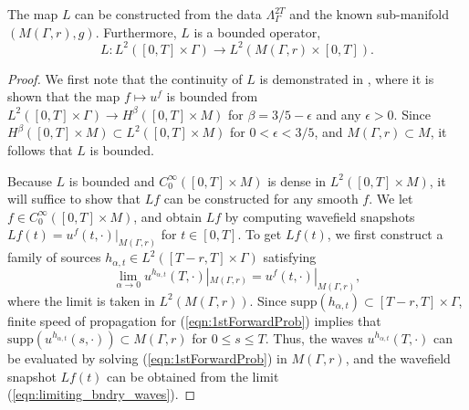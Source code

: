 \documentclass[final,leqno]{siamart1116}
\begin{document}
\begin{lemma}
  \label{thm:MovingRec}
  The map $L$ can be constructed from the data $\Lambda_{\Gamma}^{2T}$
  and the known sub-manifold $(M(\Gamma,r),g)$. Furthermore, $L$ is a
  bounded operator,
  \begin{equation}
    L : L^2([0,T] \times \Gamma) \rightarrow L^2(M(\Gamma,r) \times [0,T]).
  \end{equation}
\end{lemma}
\begin{proof}
  We first note that the continuity of $L$ is demonstrated in
  \cite[Thm 2.0.0]{Lasiecka1991}, where it is shown that the map $f
  \mapsto u^f$ is bounded from $L^2([0,T] \times \Gamma) \rightarrow
  H^\beta([0,T] \times M)$ for $\beta = 3/5 - \epsilon$ and any
  $\epsilon > 0$. Since $H^\beta([0,T] \times M) \subset L^2([0,T]
  \times M)$ for $0 < \epsilon < 3/5$, and $M(\Gamma,r) \subset M$, it
  follows that $L$ is bounded.

  Because $L$ is bounded and $C_0^\infty([0,T]\times M)$ is dense in
  $L^2([0,T]\times M)$, it will suffice to show that $Lf$ can be
  constructed for any smooth $f$. We let $f \in C_0^\infty([0,T] \times M)$,
  and obtain $Lf$ by computing wavefield snapshots $Lf(t) = u^f(t,
  \cdot)|_{M(\Gamma,r)}$ for $t \in [0,T]$. To get $Lf(t)$, we first
  construct a family of sources $h_{\alpha,t} \in
  L^2([T-r,T]\times\Gamma)$ satisfying
  \begin{equation}
    \label{eqn:limiting_bndry_waves}
    \lim_{\alpha \rightarrow 0} u^{h_{\alpha,t}}(T,\cdot)|_{M(\Gamma,r)}
    = u^f(t,\cdot)|_{M(\Gamma,r)},
  \end{equation}
  where the limit is taken in $L^2(M(\Gamma,r))$. Since
  ${\text{supp}}(h_{\alpha,t}) \subset [T-r,T]\times\Gamma$, finite speed of
  propagation for (\ref{eqn:1stForwardProb}) implies that ${\text{supp}}(u^{h_{\alpha,t}}(s,\cdot)) \subset
  M(\Gamma,r)$ for $0 \leq s \leq T$. Thus, the waves
  $u^{h_{\alpha,t}}(T,\cdot)$ can be evaluated by solving
  (\ref{eqn:1stForwardProb}) in $M(\Gamma,r)$, and the wavefield
  snapshot $Lf(t)$ can be obtained from the limit
  (\ref{eqn:limiting_bndry_waves}).


\end{proof}
\end{document}
